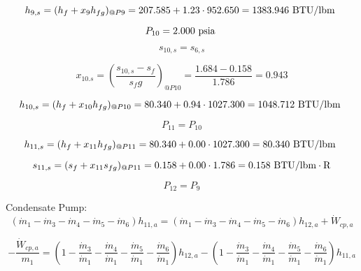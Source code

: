\documentclass{article}
\begin{document}
\begin{equation}
  h_{ 9,s} = (h_{f} + x_{ 9}h_{fg})_{@P 9} =  207.585 + 1.23\cdot 952.650 = 1383.946
\textnormal{ BTU/lbm                   }
\end{equation}

\begin{equation}
P_{10} =    2.000\textnormal{ psia                      }
\end{equation}

\begin{equation}
s_{10,s} = s_{ 6,s}
\end{equation}

\begin{equation}
x_{10.s} = (\frac{s_{10,s} - s_{f}}{s_fg})_{@P10} = \frac{   1.684 -    0.158}{   1.786} =    0.943
\end{equation}

\begin{equation}
  h_{10,s} = (h_{f} + x_{10}h_{fg})_{@P10} =   80.340 + 0.94\cdot1027.300 = 1048.712
\textnormal{ BTU/lbm                   }
\end{equation}

\begin{equation}
P_{11} = P_{10}
\end{equation}

\begin{equation}
  h_{11,s} = (h_{f} + x_{11}h_{fg})_{@P11} =   80.340 + 0.00\cdot1027.300 =   80.340
\textnormal{ BTU/lbm                   }
\end{equation}

\begin{equation}
  s_{11,s} = (s_{f} + x_{11}s_{fg})_{@P11} =    0.158 + 0.00\cdot   1.786 =    0.158
\textnormal{ BTU/lbm}\cdot\textnormal{R}
\end{equation}

\begin{equation}
P_{12} = P_{ 9}
\end{equation}


Condensate Pump:
\begin{equation}
(\dot{m}_{ 1} - \dot{m}_{ 3} - \dot{m}_{ 4} - \dot{m}_{ 5} - \dot{m}_{ 6})h_{11,a} = (\dot{m}_{ 1} - \dot{m}_{ 3} - \dot{m}_{ 4} - \dot{m}_{ 5} - \dot{m}_{ 6})h_{12,a} + \dot{W}_{cp ,a}
\end{equation}

\begin{equation}
-\frac{\dot{W}_{cp ,a}}{m_1} = (1 - \frac{\dot{m}_{ 3}}{\dot{m}_{ 1}} - \frac{\dot{m}_{ 4}}{\dot{m}_{ 1}} - \frac{\dot{m}_{ 5}}{\dot{m}_{ 1}} - \frac{\dot{m}_{ 6}}{\dot{m}_{ 1}})h_{12,a} - (1 - \frac{\dot{m}_{ 3}}{\dot{m}_{ 1}} - \frac{\dot{m}_{ 4}}{\dot{m}_{ 1}} - \frac{\dot{m}_{ 5}}{\dot{m}_{ 1}} - \frac{\dot{m}_{ 6}}{\dot{m}_{ 1}})h_{11,a}\end{equation}
\end{document}
